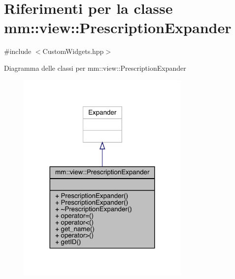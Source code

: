 \hypertarget{classmm_1_1view_1_1_prescription_expander}{}\section{Riferimenti per la classe mm\+:\+:view\+:\+:Prescription\+Expander}
\label{classmm_1_1view_1_1_prescription_expander}


{\ttfamily \#include $<$Custom\+Widgets.\+hpp$>$}



Diagramma delle classi per mm\+:\+:view\+:\+:Prescription\+Expander
\nopagebreak
\begin{figure}[H]
\begin{center}
\leavevmode
\includegraphics[width=239pt]{d8/d7b/classmm_1_1view_1_1_prescription_expander__inherit__graph}
\end{center}
\end{figure}



